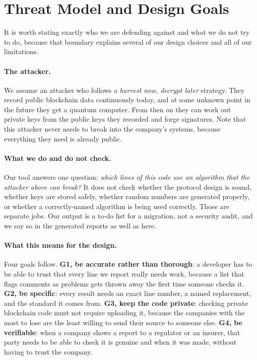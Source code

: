 \documentclass[runningheads]{llncs}
\begin{document}
\section{Threat Model and Design Goals}
\label{sec:threat}

It is worth stating exactly who we are defending against and what we do not try
to do, because that boundary explains several of our design choices and all of
our limitations.

\paragraph{The attacker.} We assume an attacker who follows a \emph{harvest
now, decrypt later} strategy. They record public blockchain data continuously
today, and at some unknown point in the future they get a quantum computer.
From then on they can work out private keys from the public keys they recorded
and forge signatures. Note that this attacker never needs to break into the
company's systems, because everything they need is already public.

\paragraph{What we do and do not check.} Our tool answers one question:
\emph{which lines of this code use an algorithm that the attacker above can
break?} It does not check whether the protocol design is sound, whether keys
are stored safely, whether random numbers are generated properly, or whether a
correctly-named algorithm is being used correctly. Those are separate jobs. Our
output is a to-do list for a migration, not a security audit, and we say so in
the generated reports as well as here.

\paragraph{What this means for the design.} Four goals follow.
\textbf{G1, be accurate rather than thorough}: a developer has to be able to
trust that every line we report really needs work, because a list that flags
comments as problems gets thrown away the first time someone checks it.
\textbf{G2, be specific}: every result needs an exact line number, a named
replacement, and the standard it comes from.
\textbf{G3, keep the code private}: checking private blockchain code must not
require uploading it, because the companies with the most to lose are the least
willing to send their source to someone else.
\textbf{G4, be verifiable}: when a company shows a report to a regulator or an
insurer, that party needs to be able to check it is genuine and when it was
made, without having to trust the company.
\end{document}
